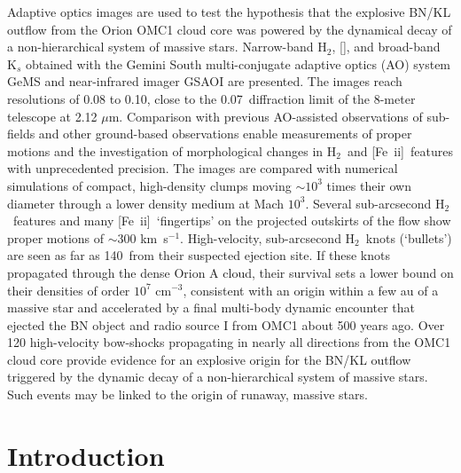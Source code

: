 \documentclass{aa}
\newcommand{\cmq}{cm{$^{-3}$}}
\newcommand{\kms}{km~s{$^{-1}$}}
\newcommand{\Feii}{[Fe~{\sc ii}]}
\newcommand{\mum}{\ensuremath{\mu \mathrm{m}}}
\newcommand{\hh}{\ensuremath{\textrm{H}_{2}}}			%
\newcommand{\feii}{\ion{Fe}{2}}		%
\begin{document}
\abstract
{}
{Adaptive optics images are used to test the hypothesis
that the explosive  BN/KL outflow from the Orion OMC1 cloud 
core was powered by the dynamical decay of a non-hierarchical
system of massive stars.  }
{
Narrow-band \hh ,  [\feii], and broad-band K$_s$ obtained with the Gemini 
South multi-conjugate adaptive optics (AO) system GeMS and near-infrared 
imager GSAOI are presented.    The images reach resolutions of  0.08 to 
0.10\arcsec, close to the 0.07\arcsec\ diffraction limit of the 8-meter 
telescope at 2.12 \mum.  Comparison with previous AO-assisted observations of 
sub-fields and other ground-based observations enable measurements of proper 
motions and the investigation of morphological changes in  \hh\ and \Feii\ features 
with  unprecedented precision.   The images are compared with numerical simulations of 
compact, high-density clumps moving $\sim 10^3$ times their own
diameter through a lower density medium at Mach $10^3$. 
}
{
Several sub-arcsecond \hh\ features and many \Feii\ `fingertips' on the 
projected outskirts of the flow show 
proper motions of $\sim$300 \kms.    High-velocity,  
sub-arcsecond   \hh\  knots (`bullets')  
are seen as far as 140\arcsec\ from their suspected ejection site.    
If these knots propagated through the dense  Orion A 
cloud, their survival  sets  a lower bound on their densities of order $10^7$ \cmq ,  
consistent with an origin within a few au of a massive star and accelerated
by a final multi-body dynamic encounter  that ejected  
the BN  object and radio source I from OMC1 about 500 years ago.  
}
{
Over 120 high-velocity bow-shocks propagating in nearly all 
directions from the OMC1 cloud core provide evidence for an explosive 
origin for the BN/KL outflow triggered by the dynamic decay of a non-hierarchical
system of massive stars.   Such events may be linked to the origin of 
runaway, massive stars. 
}

\maketitle

\section{Introduction} 
\end{document}
